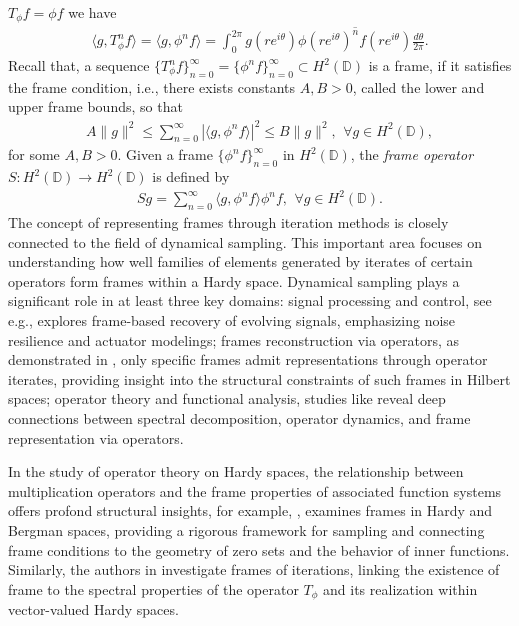 \documentclass[12pt,titlepage]{amsart}
\theoremstyle{definition}
\theoremstyle{remark}
\begin{document}
$T_\phi f = \phi f$ we have
\begin{eqnarray*}
\langle g, T_{\phi}^n f \rangle=\langle g, \phi^n f \rangle=
\int_0^{2\pi} g(r e^{i\theta}) \overline{\phi(r e^{i\theta})^n f(r
e^{i\theta})} \frac{d\theta}{2\pi}.
\end{eqnarray*}
Recall that, a sequence $\{T_\phi^n f\}_{n=0}^\infty = \{\phi^n
f\}_{n=0}^\infty \subset H^2(\mathbb{D})$ is a frame, if it
satisfies the frame condition, i.e., there exists constants $A,
B>0$, called the lower and upper frame bounds, so that
\begin{eqnarray*}\label{form1}
A \|g\|^2 \leq \sum_{n=0}^\infty |\langle g, \phi^n f \rangle|^2
\leq B \|g\|^2, \,\ \forall g \in H^2(\mathbb{D}),
\end{eqnarray*}
for some $A, B > 0$. Given a frame $\{\phi^n f\}_{n=0}^\infty$ in
$H^2(\mathbb{D})$, the \textit{frame operator} $S:H^2(\mathbb{D})
\rightarrow H^2(\mathbb{D})$ is defined by
\begin{eqnarray*}
Sg=\sum_{n=0}^{\infty}\langle g, \phi^n f\rangle \phi^n f, \,\
\forall g \in H^2(\mathbb{D}).
\end{eqnarray*}
The concept of representing frames through iteration methods is
closely connected to the field of dynamical sampling. This
important area focuses on understanding how well families of
elements generated by iterates of certain operators form frames
within a Hardy space. Dynamical sampling plays a significant role
in at least three key domains: signal processing and control, see
e.g., \cite{Aldroubi.2018} explores frame-based recovery of
evolving signals, emphasizing noise resilience and actuator
modelings; frames reconstruction via operators, as demonstrated in
\cite{Cabrelli.2020,Christensen.2017,Cheshmavar}, only specific
frames admit representations through operator iterates, providing
insight into the structural constraints of such frames in Hilbert
spaces; operator theory and functional analysis, studies like
\cite{Aldroubi.2016,Christensen.2017,Cheshmavar.2023} reveal deep
connections between spectral decomposition, operator dynamics, and
frame representation via operators.

In the study of operator theory on Hardy spaces, the relationship
between multiplication operators and the frame properties of
associated function systems offers profond structural insights,
for example, \cite{Seip}, examines frames in Hardy and Bergman
spaces, providing a rigorous framework for sampling and connecting
frame conditions to the geometry of zero sets and the behavior of
inner functions. Similarly, the authors in \cite{Aguillera}
investigate frames of iterations, linking the existence of frame
to the spectral properties of the operator $T_{\phi}$ and its
realization within vector-valued Hardy spaces.
\end{document}
